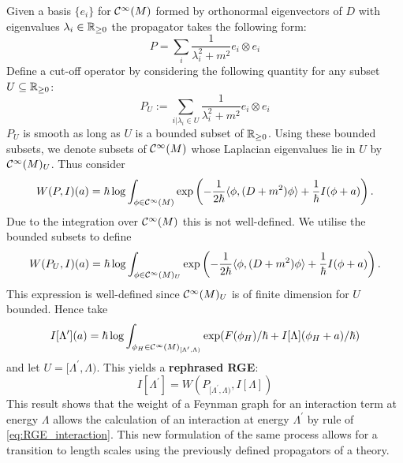 Given a basis $\{e_i\}$ for $\mathcal{C}^{\infty}(M)$ formed by orthonormal eigenvectors of $D$ with eigenvalues $\lambda_i \in \mathbb{R}_{\geq 0}$ the propagator takes the following form:
\begin{equation}
  P = \sum_i \frac{1}{\lambda_i^2 + m^2} e_i \otimes e_i
\end{equation}
Define a cut-off operator by considering the following quantity for any subset $U \subseteq \mathbb{R}_{\geq 0}$:
\begin{equation}
  P_U := \sum_{i|\lambda_i \in U} \frac{1}{\lambda_i^2 + m^2} e_i \otimes e_i
\end{equation}
$P_U$ is smooth as long as $U$ is a bounded subset of $\mathbb{R}_{\geq 0}$. Using these bounded subsets, we denote subsets of $\mathcal{C}^{\infty}(M)$ whose Laplacian eigenvalues lie in $U$ by $\mathcal{C}^{\infty}(M)_U$. Thus consider
\begin{equation}
  W(P,I)(a) = \hbar \log \int_{\phi \in \Ci(M)} \exp\left( - \frac{1}{2\hbar} \langle \phi, (D+m^2) \phi \rangle + \frac{1}{\hbar} I(\phi +a) \right).
\end{equation}
Due to the integration over $\mathcal{C}^{\infty}(M)$ this is not well-defined. We utilise the bounded subsets to define
\begin{equation}
  W(P_U,I)(a) = \hbar \log \int_{\phi \in \Ci(M)_U} \exp\left( - \frac{1}{2\hbar} \langle \phi, (D+m^2) \phi \rangle + \frac{1}{\hbar} I(\phi +a) \right).
\end{equation}
This expression is well-defined since $\mathcal{C}^{\infty}(M)_U$ is of finite dimension for $U$ bounded. Hence take
\begin{equation}
  I[\Lambda^\prime](a) = \hbar \log \int_{\phi_H \in \Ci(M)_{[\Lambda^\prime, \Lambda)}} \exp(F(\phi_H) / \hbar + I[\Lambda](\phi_H + a)/\hbar)
\end{equation}
and let $U = [\Lambda^\prime, \Lambda)$. This yields a \textbf{rephrased RGE}:
\begin{equation}
\label{eq:RGE_2}\tag{RGE}
  I[\Lambda^\prime] = W \left( P_{[\Lambda^\prime, \Lambda)}, I[\Lambda] \right)
\end{equation}
This result shows that the weight of a Feynman graph for an interaction term at energy $\Lambda$ allows the calculation of an interaction at energy $\Lambda^\prime$ by rule of \eqref{eq:RGE_interaction}. This new formulation of the same process allows for a transition to length scales using the previously defined propagators of a theory.\\

